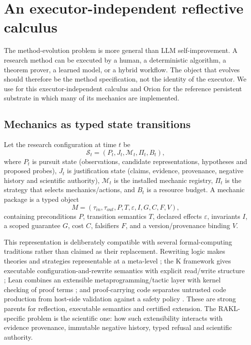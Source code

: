 \section{An executor-independent reflective calculus}\label{sec:reflective-calculus}

The method-evolution problem is more general than LLM self-improvement. A research method can be executed by a human, a deterministic algorithm, a theorem prover, a learned model, or a hybrid workflow. The object that evolves should therefore be the method specification, not the identity of the executor. We use \Framework{} for this executor-independent calculus and Orion for the reference persistent substrate in which many of its mechanics are implemented.

\subsection{Mechanics as typed state transitions}

Let the research configuration at time $t$ be
\[
\mathcal S_t=(P_t,J_t,\mathcal M_t,\Pi_t,B_t),
\]
where $P_t$ is pursuit state (observations, candidate representations, hypotheses and proposed probes), $J_t$ is justification state (claims, evidence, provenance, negative history and scientific authority), $\mathcal M_t$ is the installed mechanic registry, $\Pi_t$ is the strategy that selects mechanics/actions, and $B_t$ is a resource budget. A mechanic package is a typed object
\[
M=(\tau_{in},\tau_{out},P,T,\varepsilon,I,G,C,F,V),
\]
containing preconditions $P$, transition semantics $T$, declared effects $\varepsilon$, invariants $I$, a scoped guarantee $G$, cost $C$, falsifiers $F$, and a version/provenance binding $V$.

This representation is deliberately compatible with several formal-computing traditions rather than claimed as their replacement. Rewriting logic makes theories and strategies representable at a meta-level \cite{clavel1996reflection}; the K framework gives executable configuration-and-rewrite semantics with explicit read/write structure \cite{rosu2010k}; Lean combines an extensible metaprogramming/tactic layer with kernel checking of proof terms \cite{demoura2021lean}; and proof-carrying code separates untrusted code production from host-side validation against a safety policy \cite{necula1997pcc}. These are strong parents for reflection, executable semantics and certified extension. The RAKL-specific problem is the scientific one: how such extensibility interacts with evidence provenance, immutable negative history, typed refusal and scientific authority.

